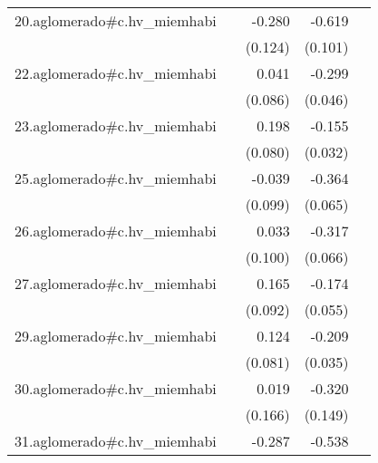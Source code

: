 {\begin{longtable}{l*{4}{D{.}{.}{-1}}}
\addlinespace
20.aglomerado#c.hv\_miemhabi&                     &      -0.280\sym{*}  &      -0.619\sym{***}&                     \\
            &                     &     (0.124)         &     (0.101)         &                     \\
\addlinespace
22.aglomerado#c.hv\_miemhabi&                     &       0.041         &      -0.299\sym{***}&                     \\
            &                     &     (0.086)         &     (0.046)         &                     \\
\addlinespace
23.aglomerado#c.hv\_miemhabi&                     &       0.198\sym{*}  &      -0.155\sym{***}&                     \\
            &                     &     (0.080)         &     (0.032)         &                     \\
\addlinespace
25.aglomerado#c.hv\_miemhabi&                     &      -0.039         &      -0.364\sym{***}&                     \\
            &                     &     (0.099)         &     (0.065)         &                     \\
\addlinespace
26.aglomerado#c.hv\_miemhabi&                     &       0.033         &      -0.317\sym{***}&                     \\
            &                     &     (0.100)         &     (0.066)         &                     \\
\addlinespace
27.aglomerado#c.hv\_miemhabi&                     &       0.165         &      -0.174\sym{**} &                     \\
            &                     &     (0.092)         &     (0.055)         &                     \\
\addlinespace
29.aglomerado#c.hv\_miemhabi&                     &       0.124         &      -0.209\sym{***}&                     \\
            &                     &     (0.081)         &     (0.035)         &                     \\
\addlinespace
30.aglomerado#c.hv\_miemhabi&                     &       0.019         &      -0.320\sym{*}  &                     \\
            &                     &     (0.166)         &     (0.149)         &                     \\
\addlinespace
31.aglomerado#c.hv\_miemhabi&                     &      -0.287\sym{*}  &      -0.538\sym{***}&                     \\

\end{longtable}}
